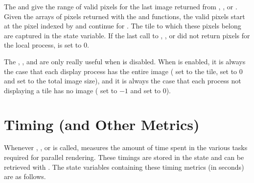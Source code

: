 The  and
 give the range of valid pixels for the
last image returned from , ,
or .  Given the arrays of pixels returned with the
 and  functions, the
valid pixels start at the pixel indexed by
 and continue for
.  The tile to which these pixels belong
are captured in the  state variable.  If
the last call to , , or
 did not return pixels for the local process,
 is set to $0$.

The , ,
and  are only really useful when
 is disabled.  When
 is enabled, it is always the case that each
display process has the entire image ( set
to the tile,  set to $0$ and
 set to the total image size), and it is
always the case that each process not displaying a tile has no image
( set to $-1$ and
 set to $0$).


\section{Timing (and Other Metrics)}
\label{sec:Customizing_Compositing:Timing}

Whenever , , or
 is called, \IceT measures the amount of time spent
in the various tasks required for parallel rendering.  These timings are
stored in the \IceT state and can be retrieved with .  The
state variables containing these timing metrics (in seconds) are as
follows.

